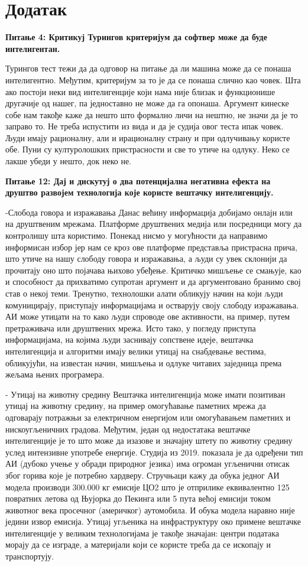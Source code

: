 \section*{Додатак}
\noindent \textbf{Питање 4: Критикуј Турингов критеријум да софтвер може да буде интелигентан.}

Турингов тест тежи да да одговор на питање да ли машина може да се понаша интелигентно. Међутим, критеријум за то је да се понаша слично као човек. Шта ако постоји неки вид интелигенције који нама није близак и функционише другачије од нашег, па једноставно не може да га опонаша. Аргумент кинеске собе нам такође каже да нешто што формално личи на нештно, не значи да је то заправо то. Не треба испустити из вида и да је судија овог теста ипак човек. Људи имају рационалну, али и ирационалну страну и при одлучивању користе обе. Пуни су културолошких пристрасности и све то утиче на одлуку. Неко се лакше убеди у нешто, док неко не.

\noindent \textbf{Питање 12: Дај и дискутуј о два потенцијална негативна ефекта на друштво развојем технологија које користе вештачку интелигенцију.}

-Слобода говора и изражавања
Данас већину информација добијамо онлајн или на друштвеним мрежама. Платформе друштвених медија или посредници могу да контролишу шта користимо. Понекад нисмо у могућности да направимо информисан избор јер нам се кроз ове платформе представља пристрасна прича, што утиче на нашу слободу говора и изражавања, а људи су увек склонији да прочитају оно што појачава њихово убеђење. Критичко мишљење се смањује, као и способност да прихватимо супротан аргумент и да аргументовано бранимо свој став о некој теми. Тренутно, технолошки алати обликују начин на који људи комуницирају, приступају информацијама и остварују своју слободу изражавања. АИ може утицати на то како људи спроводе ове активности, на пример, путем претраживача или друштвених мрежа. Исто тако, у погледу приступа информацијама, на којима људи заснивају сопствене идеје, вештачка интелигенција и алгоритми имају велики утицај на снабдевање вестима, обликујући, на известан начин, мишљења и одлуке читавих заједница према жељама њених програмера.

- Утицај на животну средину
Вештачка интелигенција може имати позитиван утицај на животну средину, на пример омогућавање паметних мрежа да одговарају потражњи за електричном енергијом или омогућавањем паметних и нискоугљеничних градова. Међутим, један од недостатака вештачке интелигенције је то што може да изазове и значајну штету по животну средину услед интензивне употребе енергије. Студија из 2019. показала је да одређени тип АИ (дубоко учење у обради природног језика) има огроман угљенични отисак због горива које је потребно хардверу. Стручњаци кажу да обука једног АИ модела производи 300.000 кг емисије ЦО2 што је отприлике еквивалентно 125 повратних летова од Њујорка до Пекинга или 5 пута већој емисији током животног века просечног (америчког) аутомобила. И обука модела наравно није једини извор емисија. Утицај угљеника на инфраструктуру око примене вештачке интелигенције у великим технологијама је такође значајан: центри података морају да се изграде, а материјали који се користе треба да се ископају и транспортују.
